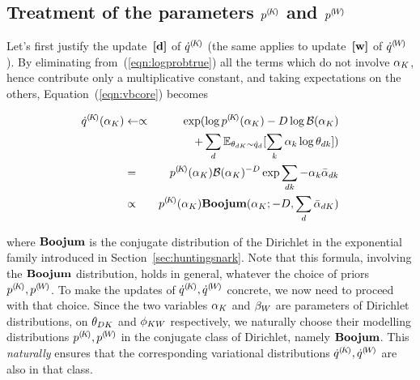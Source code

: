 \subsection{Treatment of the parameters ${p}^{(\!{K}\!)}$ and ${p}^{(\!{W}\!)}$}
Let's first justify the update~$\textbf{[d]}$ of ${\dot{q}}^{(\!{K}\!)}$ (the same applies to update~$\textbf{[w]}$ of ${\dot{q}}^{(\!{W}\!)}$). By eliminating from~(\ref{eqn:logprobtrue}) all the terms which do not involve $\alpha_K$, hence contribute only a multiplicative constant, and taking expectations on the others, Equation~(\ref{eqn:vbcore}) becomes
\begin{small}
\begin{eqnarray*}
\cpnt{\dot{q}}{K}(\vmK_K)
& \assignn\propto &
\exp(\log\cpnt{p}{K}(\vmK_K)-D\log\mathcal{B}(\vmK_K)\\
& & +\sum_d\expectation_{\vmDK_{dK}\sim\dot{q}_d}[\sum_k\vmK_k\log\vmDK_{dk}])\\
& = &
\cpnt{p}{K}(\vmK_K)\mathcal{B}(\vmK_K)^{-D}\exp\sum_{dk}-\vmK_k\vvmbDK_{dk}\\
& \propto &
\cpnt{p}{K}(\vmK_K)\mbeta(\vmK_K;-D,\sum_d\vvmbDK_{dK})
\end{eqnarray*}
\end{small}
where $\mathbf{Boojum}$ is the conjugate distribution of the Dirichlet in the exponential family introduced in Section~\ref{sec:huntingsnark}. Note that this formula, involving the $\mathbf{Boojum}$ distribution, holds in general, whatever the choice of priors ${p}^{(\!{K}\!)},{p}^{(\!{W}\!)}$. To make the updates of ${\dot{q}}^{(\!{K}\!)},{\dot{q}}^{(\!{W}\!)}$ concrete, we now need to proceed with that choice. Since the two variables $\alpha_K$ and $\beta_W$ are parameters of Dirichlet distributions, on $\theta_{DK}$ and $\phi_{KW}$ respectively, we naturally choose their modelling distributions ${p}^{(\!{K}\!)},{p}^{(\!{W}\!)}$ in the conjugate class of Dirichlet, namely $\mathbf{Boojum}$. This {\em naturally} ensures that the corresponding variational distributions ${\dot{q}}^{(\!{K}\!)},{\dot{q}}^{(\!{W}\!)}$ are also in that class.

